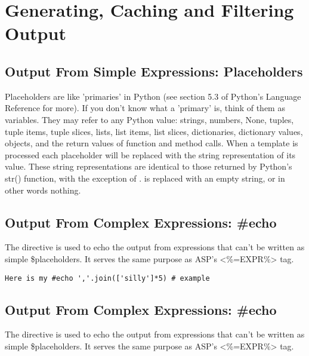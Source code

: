 \section{Generating, Caching and Filtering Output}
\label{output}

\subsection{Output From Simple Expressions: Placeholders}
\label{TDL.placeholders}

Placeholders are like 'primaries' in Python (see section 5.3 of Python's
Language Reference for more). If you don't know what a 'primary' is, think of
them as variables. They may refer to any Python value: strings, numbers, None,
tuples, tuple items, tuple slices, lists, list items, list slices, dictionaries,
dictionary values, objects, and the return values of function and method calls.
When a template is processed each placeholder will be replaced with the string
representation of its value.  These string representations are identical to
those returned by Python's str() function, with the exception of .
 is replaced with an empty string, or in other words nothing.

\subsection{Output From Complex Expressions: \#echo}
\label{TDL.echo}

The  directive is used to echo the output from expressions that
can't be written as simple \$placeholders.  It serves the same purpose as ASP's
<\%=EXPR\%> tag.

\begin{verbatim}
Here is my #echo ','.join(['silly']*5) # example 
\end{verbatim}

\subsection{Output From Complex Expressions: \#echo}
\label{TDL.echo}

The  directive is used to echo the output from expressions that
can't be written as simple \$placeholders.  It serves the same purpose as ASP's
<\%=EXPR\%> tag.


